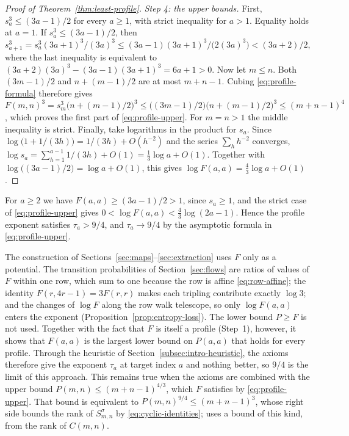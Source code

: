 \begin{proof}[Proof of Theorem~\ref{thm:least-profile}]
\emph{Step 4: the upper bounds.}
First, \(s_a^3\le(3a-1)/2\) for every \(a\ge1\), with strict inequality
for \(a>1\). Equality holds at \(a=1\). If \(s_a^3\le(3a-1)/2\), then
\(s_{a+1}^3=s_a^3(3a+1)^3/(3a)^3\le(3a-1)(3a+1)^3/\bigl(2(3a)^3\bigr)
<(3a+2)/2\), where the last inequality is equivalent to
\((3a+2)(3a)^3-(3a-1)(3a+1)^3=6a+1>0\). Now let \(m\le n\). Both
\((3m-1)/2\) and \(n+(m-1)/2\) are at most \(m+n-1\). Cubing
\eqref{eq:profile-formula} therefore gives
\(F(m,n)^3=s_m^3\bigl(n+(m-1)/2\bigr)^3
\le\bigl((3m-1)/2\bigr)\bigl(n+(m-1)/2\bigr)^3\le(m+n-1)^4\),
which proves the first part of \eqref{eq:profile-upper}. For
\(m=n>1\) the middle inequality is strict. Finally, take logarithms in
the product for \(s_a\). Since
\(\log\bigl(1+1/(3h)\bigr)=1/(3h)+O(h^{-2})\) and the series
\(\sum_hh^{-2}\) converges,
\(\log s_a=\sum_{h=1}^{a-1}1/(3h)+O(1)=\frac13\log a+O(1)\).
Together with \(\log\bigl((3a-1)/2\bigr)=\log a+O(1)\), this gives
\(\log F(a,a)=\frac43\log a+O(1)\).
\end{proof}

For \(a\ge2\) we have \(F(a,a)\ge(3a-1)/2>1\), since \(s_a\ge1\), and
the strict case of \eqref{eq:profile-upper} gives
\(0<\log F(a,a)<\frac43\log(2a-1)\). Hence the profile exponent
satisfies \(\tau_a>9/4\), and \(\tau_a\to9/4\) by the asymptotic formula
in \eqref{eq:profile-upper}.

\begin{remark}
\label{rem:profile-limit}
The construction of Sections~\ref{sec:maps}--\ref{sec:extraction}
uses \(F\) only as a potential. The transition
probabilities of Section~\ref{sec:flows} are ratios of values of \(F\)
within one row, which sum to one because the row is affine
\eqref{eq:row-affine}; the identity \(F(r,4r-1)=3F(r,r)\) makes each
tripling contribute exactly \(\log3\); and the changes of \(\log F\)
along the row walk telescope, so only \(\log F(a,a)\) enters the
exponent (Proposition~\ref{prop:entropy-loss}). The lower bound
\(P\ge F\) is not used. Together with the fact that \(F\) is itself a
profile (Step~1), however, it shows that \(F(a,a)\) is the largest
lower bound on \(P(a,a)\) that holds for every profile. Through the
heuristic of Section~\ref{subsec:intro-heuristic}, the axioms therefore
give the exponent \(\tau_a\) at target index \(a\) and nothing better,
so \(9/4\) is the limit of this approach. This remains true when the axioms
are combined with the upper bound \(P(m,n)\le(m+n-1)^{4/3}\), which
\(F\) satisfies by \eqref{eq:profile-upper}. That bound is equivalent to
\(P(m,n)^{9/4}\le(m+n-1)^3\), whose right side bounds the rank of
\(S^\sigma_{m,n}\) by \eqref{eq:cyclic-identities};
\citet[eq.~(4.5)]{OAI26} uses a bound of this kind, from the rank of
\(C(m,n)\).
\end{remark}
